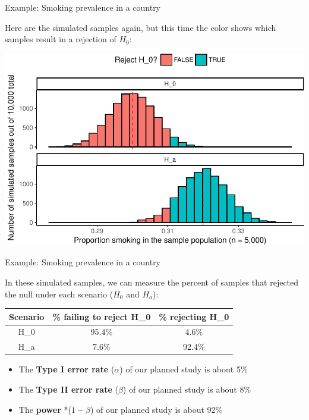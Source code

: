 \documentclass[ignorenonframetext,]{beamer}
\providecommand{\tightlist}{%
  \setlength{\itemsep}{0pt}\setlength{\parskip}{0pt}}
\begin{document}
\begin{frame}{Example: Smoking prevalence in a country}

Here are the simulated samples again, but this time the color shows
which samples result in a rejection of \(H_0\):

\begin{center}\includegraphics[height=0.7\textheight]{sample_size_files/figure-beamer/unnamed-chunk-2-1} \end{center}

\end{frame}

\begin{frame}{Example: Smoking prevalence in a country}

In these simulated samples, we can measure the percent of samples that
rejected the null under each scenario (\(H_0\) and \(H_a\)):

\begin{longtable}[]{@{}ccc@{}}
\toprule
Scenario & \% failing to reject H\_0 & \% rejecting H\_0\tabularnewline
\midrule
\endhead
H\_0 & 95.4\% & 4.6\%\tabularnewline
H\_a & 7.6\% & 92.4\%\tabularnewline
\bottomrule
\end{longtable}

\begin{itemize}
\tightlist
\item
  The \textbf{Type I error rate} (\(\alpha\)) of our planned study is
  about 5\%
\item
  The \textbf{Type II error rate} (\(\beta\)) of our planned study is
  about 8\%
\item
  The \textbf{power} *(\(1 - \beta\)) of our planned study is about 92\%
\end{itemize}

\end{frame}
\end{document}

